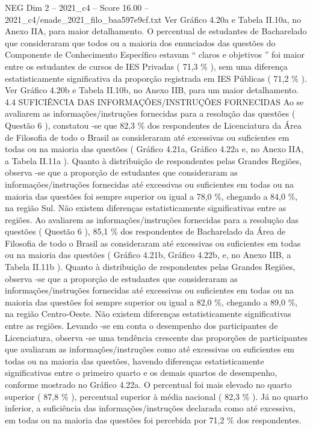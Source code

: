 \begin{textsample}{NEG Dim 2 – 2021\_c4 – Score 16.00 – 2021\_c4/enade\_2021\_filo\_baa597e9cf.txt}
Ver Gráfico 4.20a e Tabela II.10a, no Anexo IIA, para maior detalhamento.
O percentual de estudantes de Bacharelado que consideraram que todos ou a maioria dos enunciados das questões do Componente de Conhecimento Específico estavam “ claros e objetivos ” foi maior entre os estudantes de cursos de IES Privadas ( 71,3 \% ), sem uma diferença estatisticamente significativa da proporção registrada em IES Públicas ( 71,2 \% ).
Ver Gráfico 4.20b e Tabela II.10b, no Anexo IIB, para um maior detalhamento. 4.4 SUFICIÊNCIA DAS INFORMAÇÕES/INSTRUÇÕES FORNECIDAS Ao se avaliarem as informações/instruções fornecidas para a resolução das questões ( Questão 6 ), constatou -se que 82,3 \% dos respondentes de Licenciatura da Área de Filosofia de todo o Brasil as consideraram até excessivas ou suficientes em todas ou na maioria das questões ( Gráfico 4.21a, Gráfico 4.22a e, no Anexo IIA, a Tabela II.11a ).
Quanto à distribuição de respondentes pelas Grandes Regiões, observa -se que a proporção de estudantes que consideraram as informações/instruções fornecidas até excessivas ou suficientes em todas ou na maioria das questões foi sempre superior ou igual a 78,0 \%, chegando a 84,0 \%, na região Sul.
Não existem diferenças estatisticamente significativas entre as regiões.
Ao avaliarem as informações/instruções fornecidas para a resolução das questões ( Questão 6 ), 85,1 \% dos respondentes de Bacharelado da Área de Filosofia de todo o Brasil as consideraram até excessivas ou suficientes em todas ou na maioria das questões ( Gráfico 4.21b, Gráfico 4.22b, e, no Anexo IIB, a Tabela II.11b ).
Quanto à distribuição de respondentes pelas Grandes Regiões, observa -se que a proporção de estudantes que consideraram as informações/instruções fornecidas até excessivas ou suficientes em todas ou na maioria das questões foi sempre superior ou igual a 82,0 \%, chegando a 89,0 \%, na região Centro-Oeste.
Não existem diferenças estatisticamente significativas entre as regiões.
Levando -se em conta o desempenho dos participantes de Licenciatura, observa -se uma tendência crescente das proporções de participantes que avaliaram as informações/instruções como até excessivas ou suficientes em todas ou na maioria das questões, havendo diferenças estatisticamente significativas entre o primeiro quarto e os demais quartos de desempenho, conforme mostrado no Gráfico 4.22a.
O percentual foi mais elevado no quarto superior ( 87,8 \% ), percentual superior à média nacional ( 82,3 \% ).
Já no quarto inferior, a suficiência das informações/instruções declarada como até excessiva, em todas ou na maioria das questões foi percebida por 71,2 \% dos respondentes.

\end{textsample}
